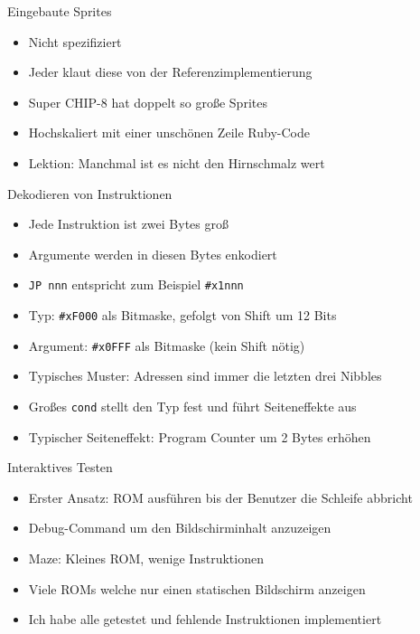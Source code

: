 \documentclass[presentation]{beamer}
\begin{document}
\begin{frame}[label={sec:orgbf74113}]{Eingebaute Sprites}
\begin{itemize}
\item Nicht spezifiziert
\item Jeder klaut diese von der Referenzimplementierung
\item Super CHIP-8 hat doppelt so große Sprites
\item Hochskaliert mit einer unschönen Zeile Ruby-Code
\item Lektion: Manchmal ist es nicht den Hirnschmalz wert
\end{itemize}
\end{frame}

\begin{frame}[fragile,label={sec:org9f8c750}]{Dekodieren von Instruktionen}
 \begin{itemize}
\item Jede Instruktion ist zwei Bytes groß
\item Argumente werden in diesen Bytes enkodiert
\item \texttt{JP nnn} entspricht zum Beispiel \texttt{\#x1nnn}
\item Typ: \texttt{\#xF000} als Bitmaske, gefolgt von Shift um 12 Bits
\item Argument: \texttt{\#x0FFF} als Bitmaske (kein Shift nötig)
\item Typisches Muster: Adressen sind immer die letzten drei Nibbles
\item Großes \texttt{cond} stellt den Typ fest und führt Seiteneffekte aus
\item Typischer Seiteneffekt: Program Counter um 2 Bytes erhöhen
\end{itemize}
\end{frame}

\begin{frame}[label={sec:orgf618bba}]{Interaktives Testen}
\begin{itemize}
\item Erster Ansatz: ROM ausführen bis der Benutzer die Schleife abbricht
\item Debug-Command um den Bildschirminhalt anzuzeigen
\item Maze: Kleines ROM, wenige Instruktionen
\item Viele ROMs welche nur einen statischen Bildschirm anzeigen
\item Ich habe alle getestet und fehlende Instruktionen implementiert
\end{itemize}
\end{frame}
\end{document}
